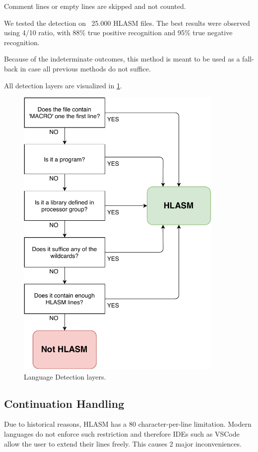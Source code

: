 Comment lines or empty lines are skipped and not counted. 

We tested the detection on ~25.000 HLASM files. The best results were observed using 4/10 ratio, with 88\% true positive recognition and 95\% true negative recognition. 

Because of the indeterminate outcomes, this method is meant to be used as a fall-back in case all previous methods do not suffice.

All detection layers are visualized in \cref{fig08:lang}.

\begin{figure}
	\centering
	\includegraphics[width=10cm]{img/lang_detection}
	\caption{Language Detection layers.}
	
	\label{fig08:lang}
\end{figure}

\subsection{Continuation Handling}

Due to historical reasons, HLASM has a 80 character-per-line limitation. Modern languages do not enforce such restriction and therefore IDEs such as VSCode allow the user to extend their lines freely. This causes 2 major inconveniences.

